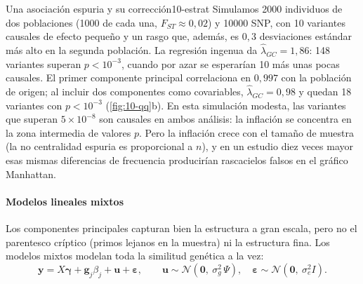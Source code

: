 \begin{ejemplo}{Una asociación espuria y su corrección}{10-estrat}
Simulamos \num{2000} individuos de dos poblaciones (\num{1000} de cada una, $F_{ST}\approx0{,}02$) y \num{10000} SNP, con 10 variantes causales de efecto pequeño y un rasgo que, además, es $0{,}3$ desviaciones estándar más alto en la segunda población. La regresión ingenua da $\hat\lambda_{GC}=1{,}86$: 148 variantes superan $p<10^{-3}$, cuando por azar se esperarían 10 más unas pocas causales. El primer componente principal correlaciona en $0{,}997$ con la población de origen; al incluir dos componentes como covariables, $\hat\lambda_{GC}=0{,}98$ y quedan 18 variantes con $p<10^{-3}$ (\cref{fig:10-qq}b). En esta simulación modesta, las variantes que superan $5\times10^{-8}$ son causales en ambos análisis: la inflación se concentra en la zona intermedia de valores $p$. Pero la inflación crece con el tamaño de muestra (la no centralidad espuria es proporcional a $n$), y en un estudio diez veces mayor esas mismas diferencias de frecuencia producirían rascacielos falsos en el gráfico Manhattan.
\end{ejemplo}

\paragraph{Modelos lineales mixtos} Los componentes principales capturan bien la estructura a gran escala, pero no el parentesco críptico (primos lejanos en la muestra) ni la estructura fina. Los modelos mixtos modelan toda la similitud genética a la vez:
\begin{equation}\label{eq:10-lmm}
\mathbf{y} = X\boldsymbol\gamma + \mathbf{g}_j\beta_j + \mathbf{u} + \boldsymbol\varepsilon,\qquad
\mathbf{u}\sim\mathcal N\!\left(\mathbf 0,\ \sigma_g^2\,\Psi\right),\quad
\boldsymbol\varepsilon\sim\mathcal N\!\left(\mathbf 0,\ \sigma_e^2 I\right).
\end{equation}

\begin{simbolos}
\end{simbolos}

